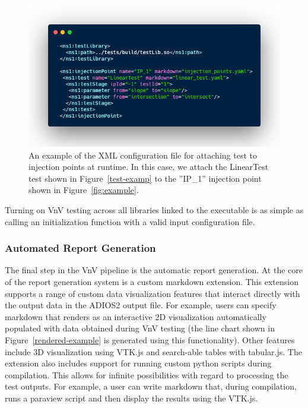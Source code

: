\begin{figure}
\centering
 \includegraphics[width=\textwidth]{./narrative/figures/test-xml1.png}
 \caption{An example of the XML configuration file for attaching test to injection points at runtime. In this case, we attach the LinearTest test shown in Figure~\ref{test-examp} to the ''IP\_1''
 injection point shown in Figure~\ref{fig:example}. \label{test-xml}}
\end{figure}

Turning on VnV testing across all libraries linked to the executable is as simple as calling an initialization function with a valid input configuration file.

\subsubsection{Automated Report Generation}

The final step in the VnV pipeline is the automatic report generation. At the core of the report generation system is a custom markdown extension. This extension supports a range of custom data visualization features that interact directly with the output data in the ADIOS2 output file. For example, users can specify markdown that renders as an interactive 2D visualization automatically populated with data obtained during VnV testing (the line chart shown in  Figure~\ref{rendered-example} is generated using this functionality). Other features include 3D visualization using VTK.js and search-able tables with tabular.js. The extension also includes support for running custom python scripts during compilation. This allows for infinite possibilities with regard to processing the test outputs. For example, a user can write markdown that, during compilation, runs a paraview script and then display the results using the VTK.js.   

